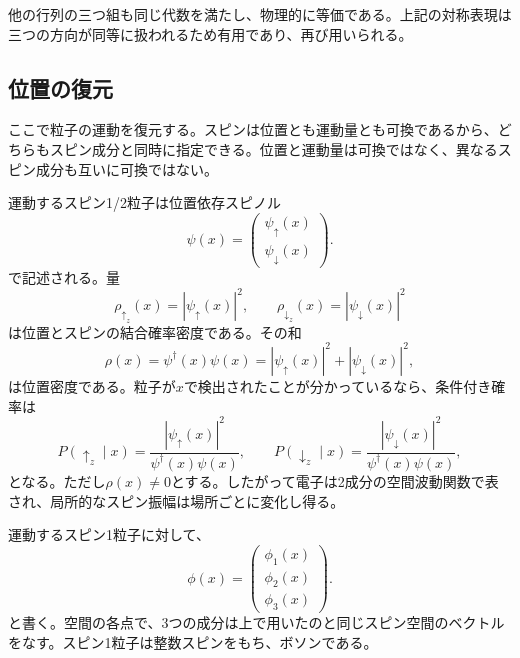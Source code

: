 他の行列の三つ組も同じ代数を満たし、物理的に等価である。上記の対称表現は三つの方向が同等に扱われるため有用であり、再び用いられる。

\subsection{位置の復元}

ここで粒子の運動を復元する。スピンは位置とも運動量とも可換であるから、どちらもスピン成分と同時に指定できる。位置と運動量は可換ではなく、異なるスピン成分も互いに可換ではない。

運動するスピン1/2粒子は位置依存スピノル
\begin{equation}
\psi(x)=
\begin{pmatrix}
\psi_\uparrow(x)\\
\psi_\downarrow(x)
\end{pmatrix}.
\end{equation}
で記述される。量
\begin{equation}
\rho_{\uparrow_z}(x)=|\psi_\uparrow(x)|^2,
\qquad
\rho_{\downarrow_z}(x)=|\psi_\downarrow(x)|^2
\end{equation}
は位置とスピンの結合確率密度である。その和
\begin{equation}
\rho(x)=\psi^\dagger(x)\psi(x)
=|\psi_\uparrow(x)|^2+|\psi_\downarrow(x)|^2,
\end{equation}
は位置密度である。粒子が\(x\)で検出されたことが分かっているなら、条件付き確率は
\begin{equation}
P(\uparrow_z\mid x)
=
\frac{|\psi_\uparrow(x)|^2}{\psi^\dagger(x)\psi(x)},
\qquad
P(\downarrow_z\mid x)
=
\frac{|\psi_\downarrow(x)|^2}{\psi^\dagger(x)\psi(x)},
\end{equation}
となる。ただし\(\rho(x)\neq0\)とする。したがって電子は2成分の空間波動関数で表され、局所的なスピン振幅は場所ごとに変化し得る。

運動するスピン1粒子に対して、
\begin{equation}
\phi(x)=
\begin{pmatrix}
\phi_1(x)\\
\phi_2(x)\\
\phi_3(x)
\end{pmatrix}.
\end{equation}
と書く。空間の各点で、3つの成分は上で用いたのと同じスピン空間のベクトルをなす。スピン1粒子は整数スピンをもち、ボソンである。

\begin{classroomqa}
\end{classroomqa}

